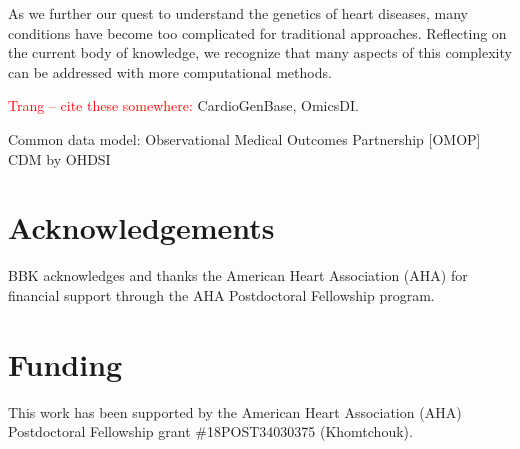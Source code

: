 \documentclass[letter]{bioinfo}
\newcommand{\comment}[1]{\textcolor{red}{#1}}
\begin{document}
	
	As we further our quest to understand the genetics of heart diseases, many conditions have become too complicated for traditional approaches. Reflecting on the current body of knowledge, we recognize that many aspects of this complexity can be addressed with more computational methods.
	
	
	\comment{Trang -- cite these somewhere:} CardioGenBase, OmicsDI.
	
	Common data model: Observational Medical Outcomes Partnership [OMOP] CDM by OHDSI
	

	\enlargethispage{12pt}
	
	
	
	
	\section*{Acknowledgements}
	
	BBK acknowledges and thanks the American Heart Association (AHA) for financial support through the AHA Postdoctoral Fellowship program.
	\vspace*{-12pt}
	
	\section*{Funding}
	
	This work has been supported by the American Heart Association (AHA) Postdoctoral Fellowship grant \#18POST34030375 (Khomtchouk).\vspace*{-12pt}
	
	
	
	
	
	
\end{document}
